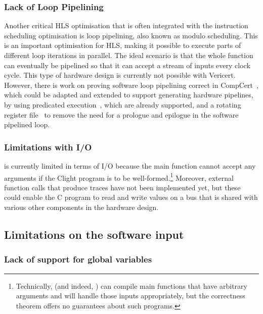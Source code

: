 \subsubsection{Lack of Loop Pipelining}

Another critical \gls{HLS} optimisation that is often integrated with the
instruction scheduling optimisation is loop pipelining, also known as modulo
scheduling.  This is an important optimisation for \gls{HLS}, making it possible
to execute parts of different loop iterations in parallel.  The ideal scenario
is that the whole function can eventually be pipelined so that it can accept a
stream of inputs every clock cycle.  This type of hardware design is currently
not possible with Vericert.  However, there is work on proving software loop
pipelining correct in CompCert~\cite{tristan10_simpl_verif_valid_softw_pipel},
which could be adapted and extended to support generating hardware pipelines, by
using predicated execution~\cite{rau92_code_gener_schem_sched_loops}, which are
already supported, and a rotating register
file~\cite{rau92_regis_alloc_softw_pipel_loops} to remove the need for a
prologue and epilogue in the software pipelined loop.

\subsubsection{Limitations with I/O}

\vericert{} is currently limited in terms of I/O because the main function
cannot accept any arguments if the Clight program is to be
well-formed.\footnote{Technically, \vericert{} (and indeed, \compcert{}) can
  compile main functions that have arbitrary arguments and will handle those
  inputs appropriately, but the correctness theorem offers no guarantees about
  such programs.} Moreover, external function calls that produce traces have not
been implemented yet, but these could enable the C program to read and write
values on a bus that is shared with various other components in the hardware
design.

\subsection{Limitations on the software input}

\subsubsection{Lack of support for global variables}

